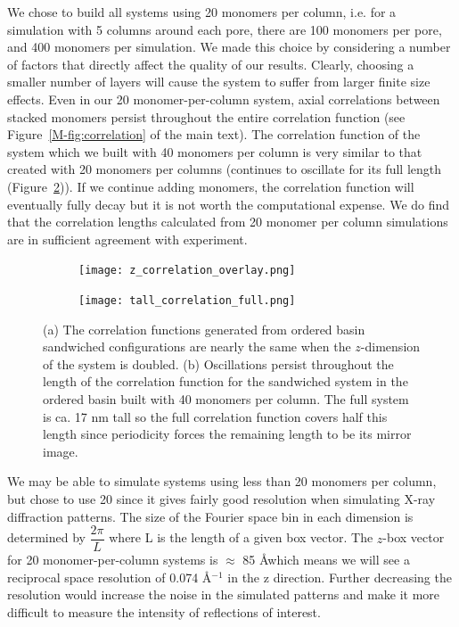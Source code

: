 \documentclass{article}
\begin{document}
  We chose to build all systems using 20 monomers per column, i.e. for a simulation with 5 columns around each pore, there are 100 monomers per pore, and 400 monomers per simulation.  We made this choice
  by considering a number of factors that directly affect the quality of our results. 
  Clearly, choosing a smaller number of layers will cause the system to suffer from 
  larger finite size effects. Even in our 20 monomer-per-column system, axial correlations
  between stacked monomers persist throughout the entire correlation function (see
  Figure~\ref{M-fig:correlation} of the main text). The correlation function of the system which we
  built with 40 monomers per column is very similar to that created with 20 monomers
  per columns (continues to oscillate for its full length
  (Figure~\ref{fig:tall_correlation_full})). If we continue adding monomers, the 
  correlation function will eventually fully decay but it is not worth the 
  computational expense. We do find that the correlation lengths calculated from 20
  monomer per column simulations are in sufficient agreement with experiment. 

  \begin{figure}[!htb]
  \centering
  \begin{subfigure}{0.45\textwidth}
  \texttt{[image: z\_correlation\_overlay.png]}
  \caption{}\label{fig:z_correlation_overlay}
  \end{subfigure}
  \begin{subfigure}{0.45\textwidth}
  \texttt{[image: tall\_correlation\_full.png]}
  \caption{}\label{fig:tall_correlation_full}
  \end{subfigure}
  \caption{(a) The correlation functions generated from ordered basin sandwiched 
  configurations are nearly the same when the $z$-dimension of the system is doubled.
  (b) Oscillations persist throughout the length of the correlation function for the
  sandwiched system in the ordered basin built with 40 monomers per column. The full
  system is ca. 17 nm tall so the full correlation function covers half this length
  since periodicity forces the remaining length to be its mirror image.}\label{fig:correlation_functions}
  \end{figure}
  
  We may be able to simulate systems using less than 20 monomers per column, but chose
  to use 20 since it gives fairly good resolution when simulating X-ray diffraction 
  patterns. The size of the Fourier space bin in each dimension is determined by 
  $\dfrac{2\pi}{L}$ where L is the length of a given box vector. The $z$-box vector 
  for 20 monomer-per-column systems is $\approx$ 85 \AA which means we will see 
  a reciprocal space resolution of 0.074 \AA$^{-1}$ in the z direction. Further decreasing
  the resolution would increase the noise in the simulated patterns and make it more
  difficult to measure the intensity of reflections of interest.
\end{document}
